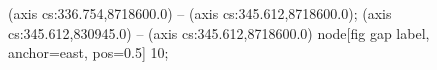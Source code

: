  (axis cs:336.754,8718600.0) -- (axis cs:345.612,8718600.0);
 (axis cs:345.612,830945.0) -- (axis cs:345.612,8718600.0)
  node[fig gap label, anchor=east, pos=0.5] {\texttimes{}10};
